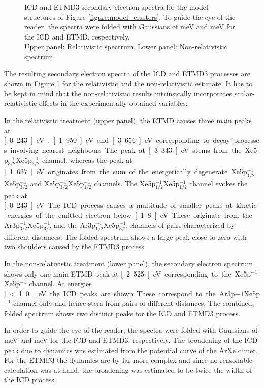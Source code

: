 \begin{figure}[]
 \centering
 
 
 \caption{\ac{ICD} and \ac{ETMD}3 secondary electron spectra for the model
          structures of Figure \ref{figure:model_clusters}. To guide the
          eye of the reader, the spectra
          were folded with Gaussians of \unit[300]{meV} and \unit[600]{meV}
          for the \ac{ICD} and \ac{ETMD}, respectively.\\
          Upper panel: Relativistic spectrum. Lower panel: Non-relativistic
          spectrum.}
 \label{figure:arxe_model}
\end{figure}

The resulting secondary electron spectra of the \ac{ICD} and
\ac{ETMD}3 processes are shown in Figure \ref{figure:arxe_model} for the
relativistic and the non-relativistic estimate.
It has to be kept in mind that the non-relativistic results intrinsically
incorporates scalar-relativistic effects in the experimentally obtained variables.

In the relativistic treatment (upper panel), the \ac{ETMD} causes three main
peaks at \unit[0.243]{eV}, \unit[1.950]{eV} and \unit[3.656]{eV}
corresponding to decay
processes involving nearest neighbours. The peak at \unit[3.343]{eV} stems
from the Xe5p$_{3/2}^{-1}$Xe5p$_{3/2}^{-1}$ channel, whereas the peak
at \unit[1.637]{eV} originates from the sum of the energetically degenerate
Xe5p$_{1/2}^{-1}$Xe5p$_{3/2}^{-1}$ and Xe5p$_{3/2}^{-1}$Xe5p$_{1/2}^{-1}$
channels. The Xe5p$_{1/2}^{-1}$Xe5p$_{1/2}^{-1}$ channel evokes the peak
at \unit[0.243]{eV}.
The \ac{ICD} process causes a multitude of smaller peaks at kinetic
energies of the emitted electron below \unit[1.8]{eV}. These originate from the
Ar3p$_{3/2}^{-1}$Xe5p$_{3/2}^{-1}$ and the Ar3p$_{1/2}^{-1}$Xe5p$_{3/2}^{-1}$
channels of pairs characterized by different distances.
The folded spectrum shows a large peak close to zero with two shoulders
caused by the \ac{ETMD}3 process.

In the non-relativistic treatment (lower panel), the secondary
electron spectrum shows only one main \ac{ETMD} peak at \unit[2.525]{eV}
corresponding to the Xe5p$^{-1}$Xe5p$^{-1}$ channel.
At energies \unit[<1.0]{eV} the \ac{ICD} peaks are shown. These correspond
to the Ar3p${-1}$Xe5p$^{-1}$ channel only and hence stem from pairs of
different distances.
The combined, folded spectrum shows two distinct peaks for the \ac{ICD} and
\ac{ETMD}3 process.

In order to guide the eye of the reader, the spectra were folded with
Gaussians of \unit[300]{meV} and \unit[600]{meV}
for the ICD and ETMD3, respectively. The broadening of the ICD peak due
to dynamics was estimated from the potential curve of the ArXe dimer. For
the ETMD3 the dynamics are by far more complex and since no reasonable
calculation was at hand, the broadening was estimated to be twice the width
of the ICD process.

